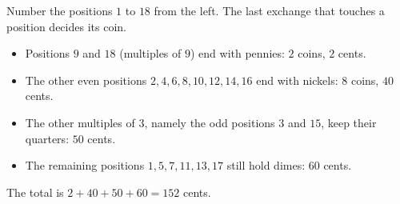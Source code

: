 Number the positions $1$ to $18$ from the left. The last exchange that touches a position decides its coin.
\begin{itemize}
\item Positions $9$ and $18$ (multiples of $9$) end with pennies: $2$ coins, $2$ cents.
\item The other even positions $2,4,6,8,10,12,14,16$ end with nickels: $8$ coins, $40$ cents.
\item The other multiples of $3$, namely the odd positions $3$ and $15$, keep their quarters: $50$ cents.
\item The remaining positions $1,5,7,11,13,17$ still hold dimes: $60$ cents.
\end{itemize}
The total is $2+40+50+60=\boxed{152}$ cents.
